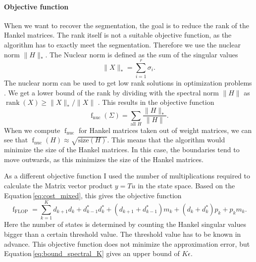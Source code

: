 \documentclass[doctype=mastersthesis,BCOR=15mm,biblatex]{ldvbook}%
\DeclareMathOperator{\rank}{rank}
\DeclareMathOperator{\f}{f}
\newcommand{\da}{d^*} %
\begin{document}
\paragraph{Objective function}
When we want to recover the segmentation, the goal is to reduce the rank of the Hankel matrices.
The rank itself is not a suitable objective function, as the algorithm has to exactly meet the segmentation.
Therefore we use the nuclear norm $\|H\|_*$.
The Nuclear norm is defined as the sum of the singular values
\begin{equation}
	\|X\|_* = \sum_{i=1}^r \sigma_i
	.
\end{equation}
The nuclear norm can be used to get low rank solutions in optimization problems \cite{liu_interior-point_2010}.
We get a lower bound of the rank by dividing with the spectral norm $\|H\|$ as $\rank(X) \geq \|X\|_*/\|X\|$ \cite{recht_guaranteed_2010}.
This results in the objective function
\begin{equation}\label{eq:objective_nuc}
	\f_{\text{nuc}}(\Sigma)= \sum_{\text{all } H} \frac{\|H\|_*}{\|H\|}
	.
\end{equation}
When we compute $\f_{\text{nuc}}$ for Hankel matrices taken out of weight matrices, we can see that $\f_{\text{nuc}}(H) \approx \sqrt{\text{size}(H)}$.
This means that the algorithm would minimize the size of the Hankel matrices.
In this case, the boundaries tend to move outwards, as this minimizes the size of the Hankel matrices.


As a different objective function I used the number of multiplications required to calculate the Matrix vector product $y=Tu$ in the state space.
Based on the Equation\,\ref{eq:cost_mixed}, this gives the objective function
\begin{equation}\label{eq:objective_flop}
\f_{\text{FLOP}} = \sum_{k=1}^Kd_{k+1}d_k + \da_{k-1}\da_k + (d_{k+1}+\da_{k-1})m_k +(d_k+\da_k)p_k +p_km_k 
.
\end{equation}
Here the number of states is determined by counting the Hankel singular values bigger than a certain threshold value. 
The threshold value has to be known in advance.
This objective function does not minimize the approximation error, but Equation\,\ref{eq:bound_spectral_K} gives an upper bound of $K\epsilon$.
\end{document}
